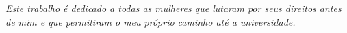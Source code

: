 \documentclass[
	12pt,				%
	openright,			%
	twoside,			%
	a4paper,			%
	english,			%
	brazil				%
	]{abntex2}
\begin{document}

%
% 
%
%
%
%    
%        
%
%      
%  

\begin{dedicatoria}
  \vspace*{\fill}
  \centering
  \noindent
  \textit{Este trabalho é dedicado a todas as mulheres que lutaram por seus direitos antes de mim e que permitiram o meu próprio caminho até a universidade.} \vspace*{\fill}
\end{dedicatoria}
\end{document}

